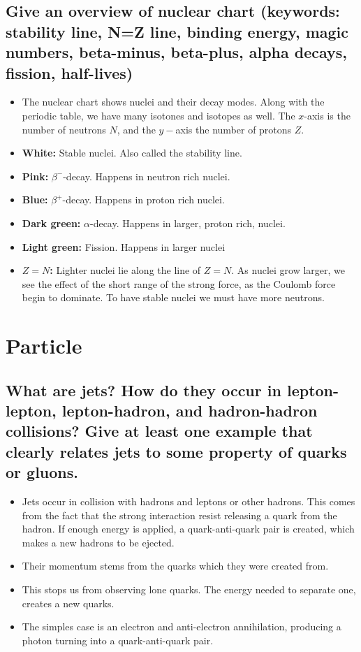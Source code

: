\documentclass{article}
\begin{document}
\subsection{Give an overview of nuclear chart (keywords: stability line, N=Z line, binding energy, magic numbers, beta-minus, beta-plus, alpha decays, fission, half-lives)}
\begin{itemize}
    \item The nuclear chart shows nuclei and their decay modes. Along with the periodic table, we have many isotones and isotopes as well. The $x$-axis is the number of neutrons $N$, and the $y-$axis the number of protons $Z$. 
    \item \textbf{White:} Stable nuclei. Also called the stability line. 
    \item \textbf{Pink:} $β^{-}$-decay. Happens in neutron rich nuclei. 
    \item \textbf{Blue:} $β^{+}$-decay. Happens in proton rich nuclei. 
    \item \textbf{Dark green:} $α$-decay. Happens in larger, proton rich, nuclei. 
    \item \textbf{Light green:} Fission. Happens in larger nuclei 
    \item \textbf{$Z=N$:} Lighter nuclei lie along the line of $Z=N$. As nuclei grow larger, we see the effect of the short range of the strong force, as the Coulomb force begin to dominate. To have stable nuclei we must have more neutrons. 
\end{itemize}


\section{Particle}
\subsection{What are jets? How do they occur in lepton-lepton, lepton-hadron, and hadron-hadron collisions? Give at least one example that clearly relates jets to some property of quarks or gluons.}
\begin{itemize}
    \item Jets occur in collision with  hadrons and leptons or other hadrons. This comes from the fact that the strong interaction resist releasing a quark from the hadron. If enough energy is applied, a quark-anti-quark pair is created, which makes a new hadrons to be ejected.
    \item Their momentum stems from the quarks which they were created from. 
    \item This stops us from observing lone quarks. The energy needed to separate one, creates a new quarks. 
    \item The simples case is an electron and anti-electron annihilation, producing a photon turning into a quark-anti-quark pair. 
\end{itemize}
\end{document}
